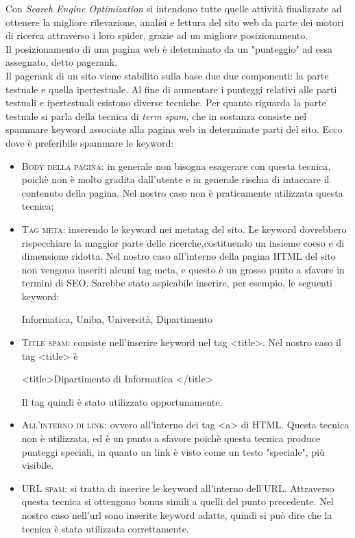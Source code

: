 Con \textit{Search Engine Optimization} si intendono tutte quelle attività finalizzate ad ottenere la migliore rilevazione, analisi e lettura del sito web da parte dei motori di ricerca attraverso i loro spider, grazie ad un migliore posizionamento. \\
Il posizionamento di una pagina web è determinato da un "punteggio" ad essa assegnato, detto pagerank.\\
Il pagerank di un sito viene stabilito sulla base due due componenti: la parte testuale e quella ipertestuale.
Al fine di aumentare i punteggi relativi alle parti testuali e ipertestuali esistono diverse tecniche.
Per quanto riguarda la parte testuale si parla della tecnica di \textit{term spam}, che in sostanza consiste nel spammare keyword associate alla pagina web in determinate parti del sito. Ecco dove è preferibile spammare le keyword:
\begin{itemize}
		\item \textsc{Body della pagina}: in generale non bisogna esagerare con questa tecnica, poichè non è molto gradita dall'utente e in 						 generale rischia di intaccare il contenuto della pagina. Nel nostro caso non è praticamente utilizzata questa tecnica;
		
		\item \textsc{Tag meta}: inserendo le keyword nei metatag del sito. Le keyword dovrebbero rispecchiare la maggior parte delle 								 ricerche,costituendo un insieme coeso e di dimensione ridotta. 
					 Nel nostro caso all'interno della pagina HTML del sito non vengono inseriti alcuni tag meta, e questo è un 										grosso punto a sfavore in termini di SEO. Sarebbe stato aspicabile inserire, per esempio, le seguenti keyword: 									\\
						\begin{center}
								Informatica, Uniba, Università, Dipartimento
						\end{center}
						
		\item \textsc{Title spam}: consiste nell'inserire keyword nel tag <title>. Nel nostro caso il tag <title> è
								\\
								\begin{center}
									<title>Dipartimento di Informatica </title>
								\end{center}	
								Il tag quindi è stato utilizzato opportunamente.	
								
		\item \textsc{All'interno di link}: ovvero all'interno dei tag <a> di HTML. Questa tecnica non è utilizzata, ed è un punto a sfavore 						 poichè questa tecnica produce punteggi speciali, in quanto un link è visto come un testo "speciale", più visibile.
		
		\item \textsc{URL spam}: si tratta di inserire le keyword all'interno dell'URL. Attraverso questa tecnica si ottengono bonus simili a 						 quelli del punto precedente. Nel nostro caso nell'url sono inserite keyword adatte, quindi si può dire che la tecnica è 						 stata utilizzata correttamente. 

\end{itemize}

